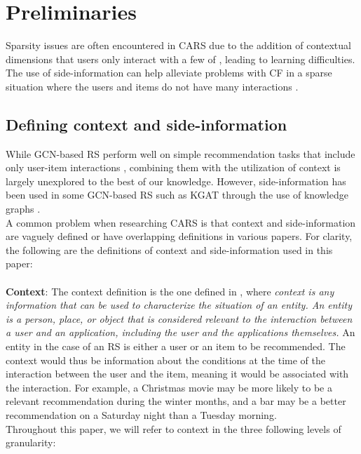 \section{Preliminaries}\label{sec:preliminaries}
Sparsity issues are often encountered in CARS due to the addition of contextual dimensions that users only interact with a few of \cite{SparsityCARS}, leading to learning difficulties.
The use of side-information can help alleviate problems with CF in a sparse situation where the users and items do not have many interactions \cite{KGAT}.

\subsection{Defining context and side-information}
While GCN-based RS perform well on simple recommendation tasks that include only user-item interactions \cite{NGCF,LightGCN}, combining them with the utilization of context is largely unexplored to the best of our knowledge.
However, side-information has been used in some GCN-based RS such as KGAT through the use of knowledge graphs \cite{KGAT}.\\
A common problem when researching CARS is that context and side-information are vaguely defined or have overlapping definitions in various papers.
For clarity, the following are the definitions of context and side-information used in this paper:
\\\\
\textbf{Context}:
The context definition is the one defined in \cite{contextDefinition}, where \textit{context is any information that can be used to characterize the situation of an entity. An entity is a person, place, or object that is considered relevant to the interaction between a user and an application, including the user and the applications themselves.}
An entity in the case of an RS is either a user or an item to be recommended.
The context would thus be information about the conditions at the time of the interaction between the user and the item, meaning it would be associated with the interaction.
For example, a Christmas movie may be more likely to be a relevant recommendation during the winter months, and a bar may be a better recommendation on a Saturday night than a Tuesday morning.\\
Throughout this paper, we will refer to context in the three following levels of granularity:\\\\
